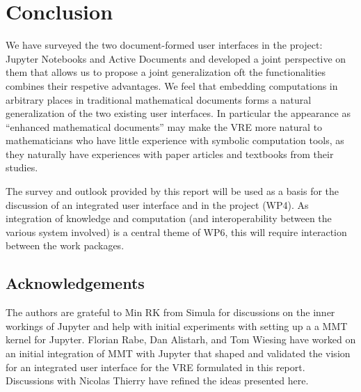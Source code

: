 \section{Conclusion}\label{sec:concl}
We have surveyed the two document-formed user interfaces in the \pn project: Jupyter
Notebooks and Active Documents and developed a joint perspective on them that allows us to
propose a joint generalization oft the functionalities combines their respetive
advantages. We feel that embedding computations in arbitrary places in traditional
mathematical documents forms a natural generalization of the two existing user
interfaces. In particular the appearance as ``enhanced mathematical documents'' may make
the VRE more natural to mathematicians who have little experience with symbolic
computation tools, as they naturally have experiences with paper articles and textbooks
from their studies.

The survey and outlook provided by this report will be used as a basis for the discussion
of an integrated user interface and in the \pn project (WP4). As integration of knowledge
and computation (and interoperability between the various system involved) is a central
theme of WP6, this will require interaction between the work packages.

\subsection*{Acknowledgements} The authors are grateful to Min RK from Simula for
discussions on the inner workings of Jupyter and help with initial experiments with
setting up a a MMT kernel for Jupyter. Florian Rabe, Dan Alistarh, and Tom Wiesing have
worked on an initial integration of MMT with Jupyter that shaped and validated the vision
for an integrated user interface for the \pn VRE formulated in this report. Discussions
with Nicolas Thierry have refined the ideas presented here.

